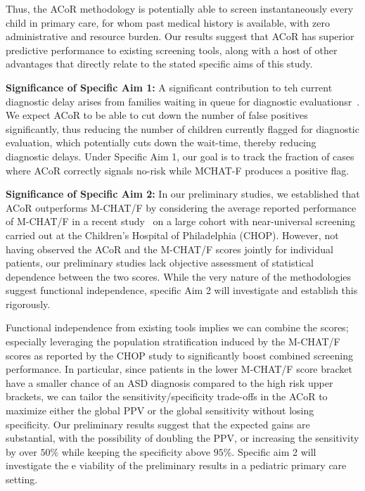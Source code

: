 \documentclass[onecolumn, compsoc,11pt]{IEEEtran}
\def\ZERO{ACoR\xspace}
\begin{document}
Thus, the \ZERO methodology is potentially able to screen instantaneously   every child  in primary care, for whom past medical history is available, with zero administrative and resource burden.
Our results suggest that \ZERO  has superior predictive performance to existing screening tools, along with a host of other advantages that directly relate to the stated specific aims of this study. 


\textbf{Significance of Specific Aim 1:} 
A significant contribution to teh current diagnostic delay arises from families waiting in queue for diagnostic evaluationsr~\cite{gordon2016whittling}. 
We expect \ZERO to be able to cut down the number of false positives significantly, thus reducing the number of children currently flagged for diagnostic evaluation, which potentially cuts down  the wait-time, thereby reducing diagnostic delays.  Under Specific Aim 1, our goal is to track the fraction of cases where \ZERO correctly signals no-risk while MCHAT-F produces a positive flag.

\textbf{Significance of Specific Aim 2:} 
In our preliminary studies, we established that \ZERO outperforms M-CHAT/F by considering the average reported performance of M-CHAT/F in a recent study~\cite{pmid31562252} on a large  cohort with near-universal screening carried out at the Children's Hospital of Philadelphia (CHOP). However, not having observed the \ZERO and the M-CHAT/F scores jointly for individual patients, our preliminary studies lack objective assessment of statistical dependence between the two scores. While the very nature of the methodologies  suggest functional independence, specific Aim 2 will investigate and establish this rigorously. 

Functional independence from existing tools implies  we can   combine the scores; especially leveraging the population stratification induced by the M-CHAT/F scores as reported by the CHOP study to significantly boost combined screening performance. In particular, since patients in the lower M-CHAT/F score bracket have a smaller chance of an ASD diagnosis compared to the high risk upper brackets, we can tailor the sensitivity/specificity trade-offs in the \ZERO to maximize  either the global PPV or the global sensitivity without losing specificity. Our preliminary results suggest that the expected gains are substantial, with the possibility of doubling the PPV, or increasing the sensitivity by over $50\%$ while keeping the specificity above $95\%$. Specific aim 2 will investigate the e viability of the preliminary results in a pediatric primary care setting.
\end{document}
